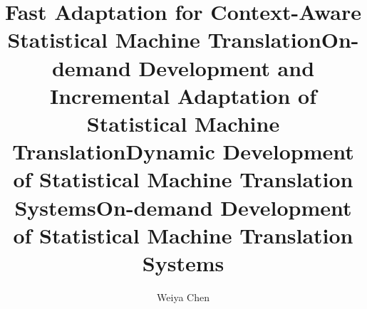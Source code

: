 \documentclass[logos]{orsay-thesis}  %
\title{Fast Adaptation for Context-Aware Statistical Machine Translation}
\title{On-demand Development and Incremental Adaptation of Statistical Machine Translation}
\title{Dynamic Development of Statistical Machine Translation Systems}
\title{On-demand Development of Statistical Machine Translation Systems}
\author{Weiya Chen}
\begin{document}

\pagestyle{empty}


\iffalse
\pagebreak\strut
 \newpage
\chapter*{Acknowledgement}

\clearpage

\chapter*{}
\thispagestyle{empty}
\textit{\hfill To supertudou.}
\fi
%

% 


%

%

%
\end{document}
